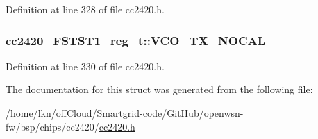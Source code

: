 Definition at line 328 of file cc2420.\+h.

\subsubsection[{\texorpdfstring{V\+C\+O\+\_\+\+T\+X\+\_\+\+N\+O\+C\+AL}{VCO_TX_NOCAL}}]{ cc2420\+\_\+\+F\+S\+T\+S\+T1\+\_\+reg\+\_\+t\+::\+V\+C\+O\+\_\+\+T\+X\+\_\+\+N\+O\+C\+AL}\hypertarget{structcc2420___f_s_t_s_t1__reg__t_a9afde96277312d0b5dc94c4c9e1e263b}{}\label{structcc2420___f_s_t_s_t1__reg__t_a9afde96277312d0b5dc94c4c9e1e263b}


Definition at line 330 of file cc2420.\+h.



The documentation for this struct was generated from the following file\+:\begin{DoxyCompactItemize}
\item 
/home/lkn/off\+Cloud/\+Smartgrid-\/code/\+Git\+Hub/openwsn-\/fw/bsp/chips/cc2420/\hyperlink{cc2420_8h}{cc2420.\+h}\end{DoxyCompactItemize}
